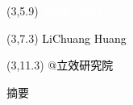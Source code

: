 \documentclass[
  ignorenonframetext,
]{beamer}
\author{}
\date{\vspace{-2.5em}}
\begin{document}
\begin{frame}
\begin{titlepage} 
\begin{center} \textbf{\Huge } \vspace{4em}
\begin{textblock}{10}(3,5.9) \huge
\textbf{\textcolor{white}{2024-06-24}}
\end{textblock} \begin{textblock}{10}(3,7.3)
\Large \textcolor{black}{LiChuang Huang}
\end{textblock} \begin{textblock}{10}(3,11.3)
\Large \textcolor{black}{@立效研究院}
\end{textblock} \end{center} \end{titlepage}
\restoregeometry
\end{frame}

\begin{frame}{摘要}
\protect\hypertarget{ux6458ux8981}{}
\end{frame}
\end{document}
